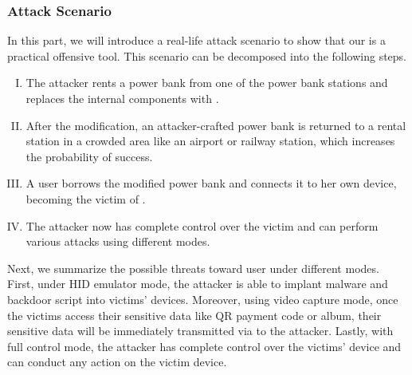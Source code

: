\subsubsection{Attack Scenario}

In this part, we will introduce a real-life attack scenario to show that our
\tool is a practical offensive tool.  This scenario can be decomposed into the
following steps.

\begin{enumerate}[I. ]
	\item The attacker rents a power bank from one of the power bank stations and replaces the internal components with \tool.
	\item After the modification, an attacker-crafted power bank is returned to a rental station in a crowded area like an airport or railway station, which increases the probability of success.
	\item A user borrows the modified power bank and connects it to her own device, becoming the victim of \tool.
	\item The attacker now has complete control over the victim and can perform various attacks using different modes.
\end{enumerate}

Next, we summarize the possible threats toward user under different modes.
First, under HID emulator mode, the attacker is able to implant malware and backdoor script into victims' devices. Moreover, using video capture mode, once the victims access their sensitive data like QR payment  code or album, their sensitive data will be immediately transmitted via \tool to the attacker. Lastly, with full control mode, the attacker has complete control over the victims' device and can conduct any action on the victim device.


